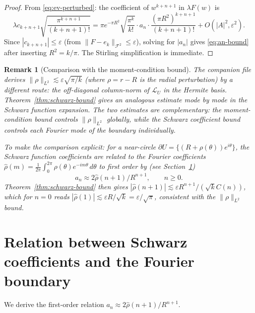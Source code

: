 \documentclass[a4paper,11pt,reqno]{amsart}
\newtheorem{remark}{Remark}[section]
\begin{document}
\begin{proof}
From \eqref{eq:ev-perturbed}: the coefficient of $w^{k+n+1}$ in $\lambda F(w)$
is
\[
\lambda c_{k+n+1}\sqrt{\frac{\pi^{k+n+1}}{(k+n+1)!}}
=\pi e^{-\pi R^2}\sqrt{\frac{\pi^k}{k!}}\cdot a_n\cdot\frac{(\pi R^2)^{k+n+1}}{(k+n+1)!}+O(|A|^2,\varepsilon^2).
\]
Since $|c_{k+n+1}|\le\varepsilon$ (from $\|F-e_k\|_{\mathcal{F}^2}\le\varepsilon$),
solving for $|a_n|$ gives \eqref{eq:an-bound} after inserting $R^2=k/\pi$.
The Stirling simplification is immediate.
\end{proof}

\begin{remark}[Comparison with the moment-condition bound]
The companion file derives $\|\rho\|_{L^2}\lesssim\varepsilon\sqrt{\pi/k}$
(where $\rho=r-R$ is the radial perturbation) by a different route: the
off-diagonal column-norm of $\mathcal{L}_U$ in the Hermite basis.
Theorem~\ref{thm:schwarz-bound} gives an analogous estimate mode by mode
in the Schwarz function expansion. The two estimates are complementary:
the moment-condition bound controls $\|\rho\|_{L^2}$ globally, while the
Schwarz coefficient bound controls each Fourier mode of the boundary
individually.

To make the comparison explicit: for a near-circle $\partial U=\{(R+\rho(\theta))e^{i\theta}\}$,
the Schwarz function coefficients are related to the Fourier coefficients
$\hat\rho(m)=\frac{1}{2\pi}\int_0^{2\pi}\rho(\theta)e^{-im\theta}\,d\theta$
to first order by (see Section~\ref{sec:schwarz-fourier})
\[
a_n\approx 2\hat\rho(n+1)/R^{n+1},\qquad n\ge0.
\]
Theorem~\ref{thm:schwarz-bound} then gives $|\hat\rho(n+1)|\lesssim\varepsilon R^{n+1}/(\sqrt{k}C(n))$,
which for $n=0$ reads $|\hat\rho(1)|\lesssim\varepsilon R/\sqrt{k}=\varepsilon/\sqrt{\pi}$,
consistent with the $\|\rho\|_{L^2}$ bound.
\end{remark}

\section{Relation between Schwarz coefficients and the Fourier boundary}
\label{sec:schwarz-fourier}

We derive the first-order relation $a_n\approx 2\hat\rho(n+1)/R^{n+1}$.
\end{document}
